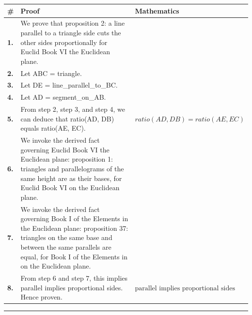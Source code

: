 \documentclass[11pt]{article}
\theoremstyle{definition}
\begin{document}
\begin{tabular}{@{} >{\raggedright\arraybackslash}p{} >{\raggedright\arraybackslash}p{} >{\raggedleft\arraybackslash}p{} @{}}
\textbf{\#} & \textbf{Proof} & \textbf{Mathematics} \\
\midrule
\textbf{1.} & We prove that proposition 2: a line parallel to a triangle side cuts the other sides proportionally for Euclid Book VI the Euclidean plane. & \\[0.45em]
\textbf{2.} & Let ABC = triangle. & \\[0.45em]
\textbf{3.} & Let DE = line\_parallel\_to\_BC. & \\[0.45em]
\textbf{4.} & Let AD = segment\_on\_AB. & \\[0.45em]
\textbf{5.} & From step 2, step 3, and step 4, we can deduce that ratio(AD, DB) equals ratio(AE, EC). & $\displaystyle ratio(AD, DB) = ratio(AE, EC)$ \\[0.45em]
\textbf{6.} & We invoke the derived fact governing Euclid Book VI the Euclidean plane: proposition 1: triangles and parallelograms of the same height are as their bases, for Euclid Book VI on the Euclidean plane. & \\[0.45em]
\textbf{7.} & We invoke the derived fact governing Book I of the Elements in the Euclidean plane: proposition 37: triangles on the same base and between the same parallels are equal, for Book I of the Elements in on the Euclidean plane. & \\[0.45em]
\textbf{8.} & From step 6 and step 7, this implies parallel implies proportional sides. Hence proven. & $\displaystyle \text{parallel implies proportional sides}$ \\[0.45em]
\bottomrule
\end{tabular}
\label{thm:Geometry-Euclid Book VI-proposition_2_a_line_parallel_to_a_triangle_side_cuts_the_other_sides_proportionally}
\par\medskip\hrule
\end{document}

